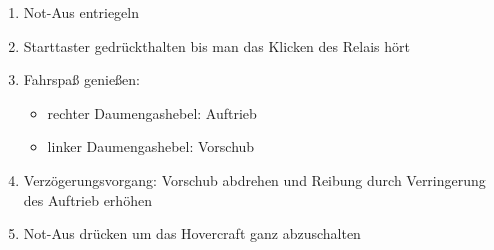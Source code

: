 \begin{enumerate}
    \item Not-Aus entriegeln
    \item Starttaster gedrückthalten bis man das Klicken des Relais hört
    \item Fahrspaß genießen:
    \begin{itemize}
        \item rechter Daumengashebel: Auftrieb
        \item linker Daumengashebel: Vorschub
    \end{itemize}
    \item Verzögerungsvorgang: Vorschub abdrehen und Reibung durch Verringerung des Auftrieb erhöhen
    \item Not-Aus drücken um das Hovercraft ganz abzuschalten
\end{enumerate}